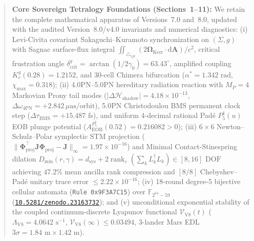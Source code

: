 \documentclass[11pt,a4paper,reqno]{article}
\newcommand{\zenodo}[1]{\href{https://doi.org/10.5281/zenodo.#1}{\texttt{10.5281/zenodo.#1}}}
\theoremstyle{plain}
\theoremstyle{definition}
\theoremstyle{remark}
\numberwithin{equation}{section}
\begin{document}
\begin{abstract}
\medskip\noindent
\textbf{Core Sovereign Tetralogy Foundations (Sections~1--11):}
We retain the complete mathematical apparatus of Versions~7.0 and~8.0, updated with the audited Version~8.0/v4.0 invariants and numerical diagnostics: (i) Levi-Civita covariant Sakaguchi--Kuramoto synchronization on $(\Sigma,g)$ with Sagnac surface-flux integral $\iint_{\triangle_{ijk}}(2\bm{\Omega}_{\mathrm{Kerr}}\cdot\mathrm{d}\mathbf{A})/c^2$, critical frustration angle $\delta_{\mathrm{crit}}^g = \arctan(1/2\gamma_0) = 63.43^\circ$, amplified coupling $K_c^g(0.28) = 1.2152$, and 30-cell Chimera bifurcation ($\alpha^* = 1.342\text{ rad}$, $\chi_{\max} = 0.318$); (ii) 4.0PN--5.0PN hereditary radiation reaction with $M_P = 4$ Markovian Prony tail modes ($|\Delta\mathcal{H}_{\mathrm{shadow}}| = 4.18 \times 10^{-13}$, $\Delta\omega_{4\mathrm{PN}} = +2.842\,\mu\mathrm{as/orbit}$), 5.0PN Christodoulou BMS permanent clock step ($\Delta\tau_{\mathrm{BMS}} = +15.487\text{ fs}$), and uniform 4-decimal rational Padé $P^1_5(u)$ EOB plunge potential ($A_{\mathrm{EOB}}^{P^1_5}(0.52) = 0.216082 > 0$); (iii) $6\times 6$ Newton--Schulz--Polar symplectic STM projection ($\lVert\bm{\Phi}_{\mathrm{proj}}^\top\mathbf{J}\bm{\Phi}_{\mathrm{proj}}-\mathbf{J}\rVert_\infty = 1.97 \times 10^{-16}$) and Minimal Contact-Stinespring dilation $D_{\min}(r,\gamma) = d_{\mathrm{sys}} + 2\operatorname{rank}_\varepsilon(\sum_k L_k^\dagger L_k) \in [8,16]\text{ DOF}$ achieving $\mathbf{47.2\%}$ mean ancilla rank compression and $[8/8]$ Chebyshev--Padé unitary trace error $\le 2.22 \times 10^{-16}$; (iv) 18-round degree-5 bijective cellular automata (\texttt{Rule 0x9F3A7C15}) over $\mathbb{F}_{2^{64}-59}$ (\zenodo{23163732}); and (v) unconditional exponential stability of the coupled continuum-discrete Lyapunov functional $\mathcal{V}_{\mathrm{V8}}(t)$ ($\Lambda_{\mathrm{V8}} = 4.0642\text{ s}^{-1}$, $\mathcal{V}_{\mathrm{V8}}(\infty) \le 0.03494$, 3-lander Mars EDL $3\sigma = 1.84\text{ m} \times 1.42\text{ m}$).


\end{abstract}
\end{document}
